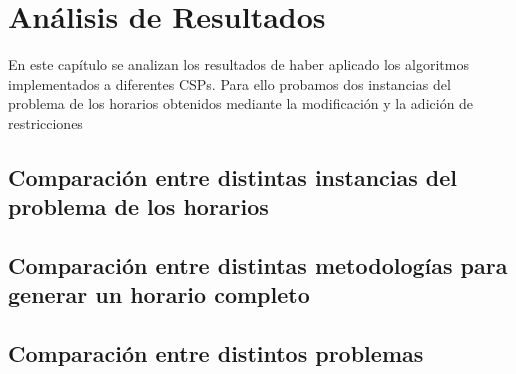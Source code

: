 \chapter{An\'alisis de Resultados}

En este cap\'itulo se analizan los resultados de haber aplicado los algoritmos implementados a diferentes CSPs. Para ello probamos dos instancias del problema de los horarios obtenidos mediante la modificaci\'on y la adici\'on de restricciones

\section{Comparaci\'on entre distintas instancias del problema de los horarios}

\section{Comparaci\'on entre distintas metodolog\'ias para generar un horario completo}

\section{Comparaci\'on entre distintos problemas}